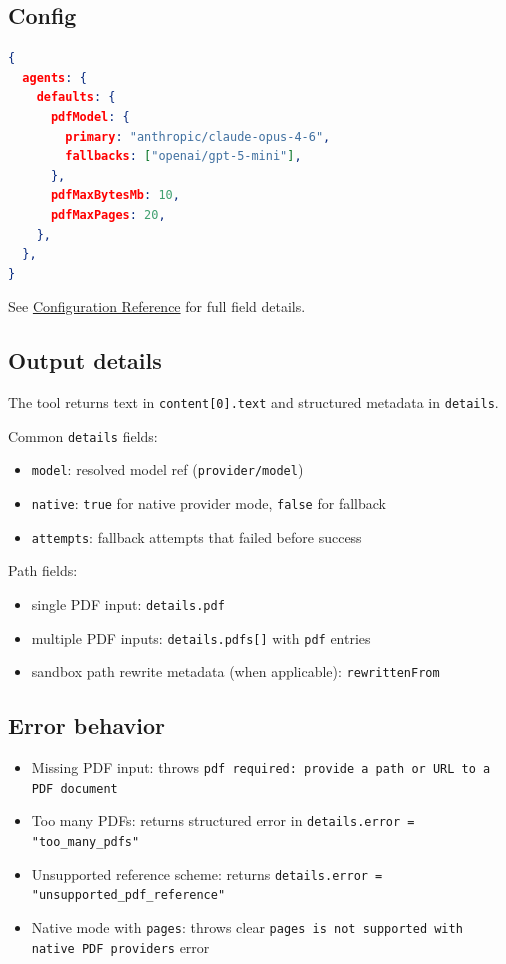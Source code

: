 \subsection{Config}


\begin{lstlisting}[language=json]
{
  agents: {
    defaults: {
      pdfModel: {
        primary: "anthropic/claude-opus-4-6",
        fallbacks: ["openai/gpt-5-mini"],
      },
      pdfMaxBytesMb: 10,
      pdfMaxPages: 20,
    },
  },
}
\end{lstlisting}


See \href{/gateway/configuration-reference}{Configuration Reference} for full field details.

\subsection{Output details}


The tool returns text in \texttt{content[0].text} and structured metadata in \texttt{details}.

Common \texttt{details} fields:

\begin{itemize}
  \item \texttt{model}: resolved model ref (\texttt{provider/model})
  \item \texttt{native}: \texttt{true} for native provider mode, \texttt{false} for fallback
  \item \texttt{attempts}: fallback attempts that failed before success
\end{itemize}


Path fields:

\begin{itemize}
  \item single PDF input: \texttt{details.pdf}
  \item multiple PDF inputs: \texttt{details.pdfs[]} with \texttt{pdf} entries
  \item sandbox path rewrite metadata (when applicable): \texttt{rewrittenFrom}
\end{itemize}


\subsection{Error behavior}


\begin{itemize}
  \item Missing PDF input: throws \texttt{pdf required: provide a path or URL to a PDF document}
  \item Too many PDFs: returns structured error in \texttt{details.error = "too\_many\_pdfs"}
  \item Unsupported reference scheme: returns \texttt{details.error = "unsupported\_pdf\_reference"}
  \item Native mode with \texttt{pages}: throws clear \texttt{pages is not supported with native PDF providers} error
\end{itemize}



